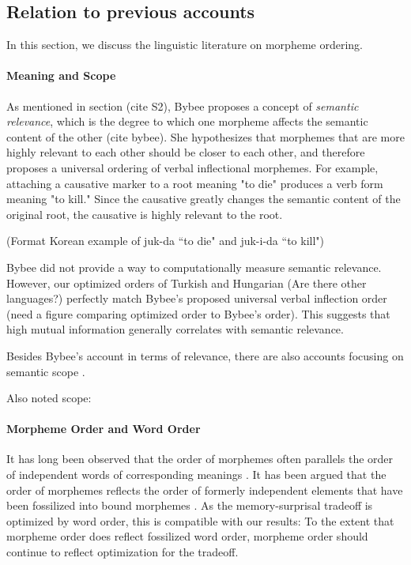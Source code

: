 \documentclass[11pt,letterpaper]{article}
\newcommand\becky[1]{{\color{blue}(#1)}}
\begin{document}
\subsection{Relation to previous accounts}


In this section, we discuss the linguistic literature on morpheme ordering.

\paragraph{Meaning and Scope}
As mentioned in section \becky{cite S2}, Bybee proposes a concept of \textit{semantic relevance}, which is the degree to which one morpheme affects the semantic content of the other \becky{cite bybee}. She hypothesizes that morphemes that are more highly relevant to each other should be closer to each other, and therefore proposes a universal ordering of verbal inflectional morphemes. For example, attaching a causative marker to a root meaning "to die" produces a verb form meaning "to kill." Since the causative greatly changes the semantic content of the original root, the causative is highly relevant to the root. 

\becky{Format Korean example of juk-da ``to die" and juk-i-da ``to kill"}

Bybee did not provide a way to computationally measure semantic relevance. However, our optimized orders of Turkish and Hungarian \becky{Are there other languages?} perfectly match Bybee's proposed universal verbal inflection order \becky{need a figure comparing optimized order to Bybee's order}. This suggests that high mutual information generally correlates with semantic relevance. 

Besides Bybee's account in terms of relevance, there are also accounts focusing on semantic scope \citep{rice2000morpheme}.

Also noted scope: \citep{baker1988incorporation,foley1984functional,chierchia1990meaning,valin1992a}



\paragraph{Morpheme Order and Word Order}
It has long been observed that the order of morphemes often parallels the order of independent words of corresponding meanings \citep{givon1971historical,venneman1973explanation,baker1985the}.
It has been argued that the order of morphemes reflects the order of formerly independent elements that have been fossilized into bound morphemes \citet{givon1971historical,venneman1973explanation}.
As the memory-surprisal tradeoff is optimized by word order, this is compatible with our results:
To the extent that morpheme order does reflect fossilized word order, morpheme order should continue to reflect optimization for the tradeoff.
\end{document}
